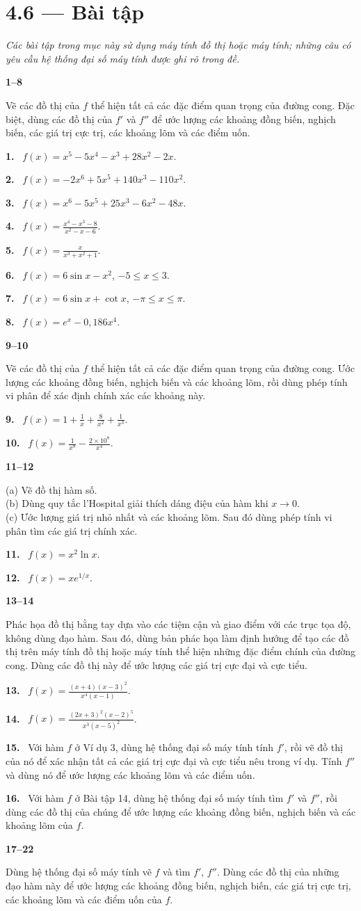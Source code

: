 \documentclass[12pt,a4paper]{article}
\newcommand{\bt}[1]{\par\smallskip\Needspace{5\baselineskip}\noindent\textbf{#1.}\ }
\newcommand{\group}[1]{\par\medskip\noindent\textbf{#1}\par\nopagebreak[4]}
\begin{document}
\section*{4.6 — Bài tập}
\noindent\textit{Các bài tập trong mục này sử dụng máy tính đồ thị hoặc máy tính; những câu có yêu cầu hệ thống đại số máy tính được ghi rõ trong đề.}
\group{1–8}
Vẽ các đồ thị của $f$ thể hiện tất cả các đặc điểm quan trọng của đường cong. Đặc biệt, dùng các đồ thị của $f'$ và $f''$ để ước lượng các khoảng đồng biến, nghịch biến, các giá trị cực trị, các khoảng lõm và các điểm uốn.
\bt{1} $f(x)=x^5-5x^4-x^3+28x^2-2x$.
\bt{2} $f(x)=-2x^6+5x^5+140x^3-110x^2$.
\bt{3} $f(x)=x^6-5x^5+25x^3-6x^2-48x$.
\bt{4} $\displaystyle f(x)=\frac{x^4-x^3-8}{x^2-x-6}$.
\bt{5} $\displaystyle f(x)=\frac{x}{x^3+x^2+1}$.
\bt{6} $f(x)=6\sin x-x^2$, $-5\le x\le3$.
\bt{7} $f(x)=6\sin x+\cot x$, $-\pi\le x\le\pi$.
\bt{8} $f(x)=e^x-0{,}186x^4$.
\group{9–10}
Vẽ các đồ thị của $f$ thể hiện tất cả các đặc điểm quan trọng của đường cong. Ước lượng các khoảng đồng biến, nghịch biến và các khoảng lõm, rồi dùng phép tính vi phân để xác định chính xác các khoảng này.
\bt{9} $\displaystyle f(x)=1+\frac1x+\frac8{x^2}+\frac1{x^3}$.
\bt{10} $\displaystyle f(x)=\frac1{x^8}-\frac{2\times10^8}{x^4}$.
\group{11–12}
(a) Vẽ đồ thị hàm số.\\
(b) Dùng quy tắc l’Hospital giải thích dáng điệu của hàm khi $x\to0$.\\
(c) Ước lượng giá trị nhỏ nhất và các khoảng lõm. Sau đó dùng phép tính vi phân tìm các giá trị chính xác.
\bt{11} $f(x)=x^2\ln x$.
\bt{12} $f(x)=xe^{1/x}$.
\group{13–14}
Phác họa đồ thị bằng tay dựa vào các tiệm cận và giao điểm với các trục tọa độ, không dùng đạo hàm. Sau đó, dùng bản phác họa làm định hướng để tạo các đồ thị trên máy tính đồ thị hoặc máy tính thể hiện những đặc điểm chính của đường cong. Dùng các đồ thị này để ước lượng các giá trị cực đại và cực tiểu.
\bt{13} $\displaystyle f(x)=\frac{(x+4)(x-3)^2}{x^4(x-1)}$.
\bt{14} $\displaystyle f(x)=\frac{(2x+3)^2(x-2)^5}{x^3(x-5)^2}$.
\bt{15} Với hàm $f$ ở Ví dụ 3, dùng hệ thống đại số máy tính tính $f'$, rồi vẽ đồ thị của nó để xác nhận tất cả các giá trị cực đại và cực tiểu nêu trong ví dụ. Tính $f''$ và dùng nó để ước lượng các khoảng lõm và các điểm uốn.
\bt{16} Với hàm $f$ ở Bài tập 14, dùng hệ thống đại số máy tính tìm $f'$ và $f''$, rồi dùng các đồ thị của chúng để ước lượng các khoảng đồng biến, nghịch biến và các khoảng lõm của $f$.
\group{17–22}
Dùng hệ thống đại số máy tính vẽ $f$ và tìm $f'$, $f''$. Dùng các đồ thị của những đạo hàm này để ước lượng các khoảng đồng biến, nghịch biến, các giá trị cực trị, các khoảng lõm và các điểm uốn của $f$.
\end{document}
